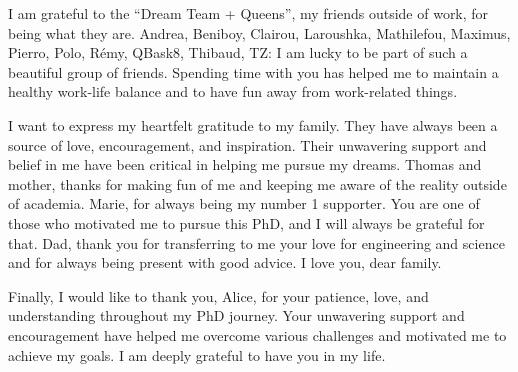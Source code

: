 I am grateful to the ``Dream Team + Queens'', my friends outside of work, for being what they are. Andrea, Beniboy, Clairou, Laroushka, Mathilefou, Maximus, Pierro, Polo, R{\'e}my, QBask8, Thibaud, TZ: I am lucky to be part of such a beautiful group of friends. Spending time with you has helped me to maintain a healthy work-life balance and to have fun away from work-related things.

I want to express my heartfelt gratitude to my family. They have always been a source of love, encouragement, and inspiration. Their unwavering support and belief in me have been critical in helping me pursue my dreams. Thomas and mother, thanks for making fun of me and keeping me aware of the reality outside of academia. Marie, for always being my number 1 supporter. You are one of those who motivated me to pursue this PhD, and I will always be grateful for that. Dad, thank you for transferring to me your love for engineering and science and for always being present with good advice. I love you, dear family.

Finally, I would like to thank you, Alice, for your patience, love, and understanding throughout my PhD journey. Your unwavering support and encouragement have helped me overcome various challenges and motivated me to achieve my goals. I am deeply grateful to have you in my life.
%
%
%
%
%
%
